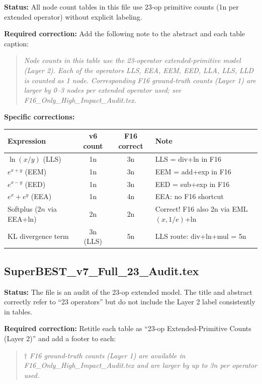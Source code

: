 \documentclass[11pt]{article}
\begin{document}
\textbf{Status:} All node count tables in this file use 23-op primitive counts (1n per extended operator)
without explicit labeling.

\textbf{Required correction:} Add the following note to the abstract and each table caption:
\begin{quote}
\textit{Node counts in this table use the 23-operator extended-primitive model
(Layer 2). Each of the operators LLS, EEA, EEM, EED, LLA, LLS, LLD is counted
as 1 node. Corresponding F16 ground-truth counts (Layer 1) are larger by
0--3 nodes per extended operator used; see F16\_Only\_High\_Impact\_Audit.tex.}
\end{quote}

\textbf{Specific corrections:}
\begin{center}
\renewcommand{\arraystretch}{1.2}
\begin{tabular}{lccl}
\toprule
Expression & v6 count & F16 correct & Note \\
\midrule
$\ln(x/y)$ (LLS) & 1n & 3n & LLS = div+ln in F16 \\
$e^{x+y}$ (EEM) & 1n & 3n & EEM = add+exp in F16 \\
$e^{x-y}$ (EED) & 1n & 3n & EED = sub+exp in F16 \\
$e^x + e^y$ (EEA) & 1n & 4n & EEA: no F16 shortcut \\
Softplus ($2n$ via EEA+ln) & 2n & 2n & Correct! F16 also 2n via EML$(x,1/e)$+ln \\
KL divergence term & 3n (LLS) & 5n & LLS route: div+ln+mul = 5n \\
\bottomrule
\end{tabular}
\end{center}

\subsection{SuperBEST\_v7\_Full\_23\_Audit.tex}

\textbf{Status:} The file is an audit of the 23-op extended model.
The title and abstract correctly refer to ``23 operators'' but do not include
the Layer 2 label consistently in tables.

\textbf{Required correction:} Retitle each table as
``23-op Extended-Primitive Counts (Layer 2)'' and add a footer to each:
\begin{quote}
\textit{$\dagger$ F16 ground-truth counts (Layer 1) are available in
F16\_Only\_High\_Impact\_Audit.tex and are larger by up to 3n per operator used.}
\end{quote}
\end{document}
